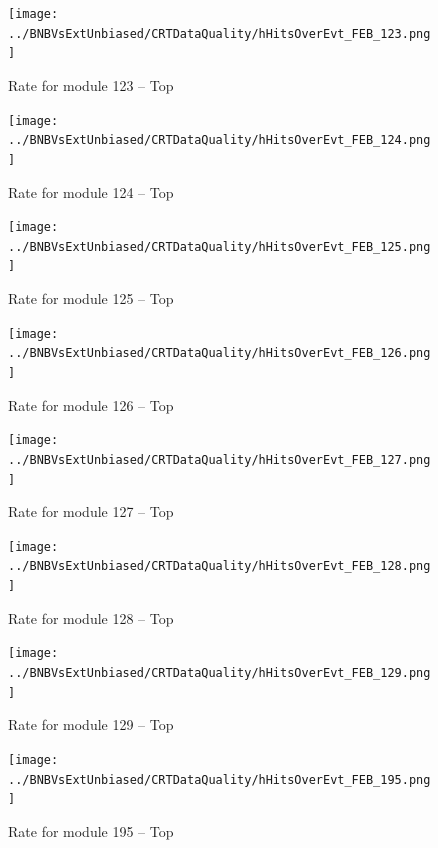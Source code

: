 \begin{figure}[h!]
\centering
\texttt{[image: ../BNBVsExtUnbiased/CRTDataQuality/hHitsOverEvt\_FEB\_123.png]}
\caption{Rate for module 123 -- Top}
\label{Annual123}
\end{figure}
\begin{figure}[h!]
\centering
\texttt{[image: ../BNBVsExtUnbiased/CRTDataQuality/hHitsOverEvt\_FEB\_124.png]}
\caption{Rate for module 124 -- Top}
\label{Annual124}
\end{figure}
\begin{figure}[h!]
\centering
\texttt{[image: ../BNBVsExtUnbiased/CRTDataQuality/hHitsOverEvt\_FEB\_125.png]}
\caption{Rate for module 125 -- Top}
\label{Annual125}
\end{figure}
\begin{figure}[h!]
\centering
\texttt{[image: ../BNBVsExtUnbiased/CRTDataQuality/hHitsOverEvt\_FEB\_126.png]}
\caption{Rate for module 126 -- Top}
\label{Annual126}
\end{figure}
\begin{figure}[h!]
\centering
\texttt{[image: ../BNBVsExtUnbiased/CRTDataQuality/hHitsOverEvt\_FEB\_127.png]}
\caption{Rate for module 127 -- Top}
\label{Annual127}
\end{figure}
\begin{figure}[h!]
\centering
\texttt{[image: ../BNBVsExtUnbiased/CRTDataQuality/hHitsOverEvt\_FEB\_128.png]}
\caption{Rate for module 128 -- Top}
\label{Annual128}
\end{figure}
\begin{figure}[h!]
\centering
\texttt{[image: ../BNBVsExtUnbiased/CRTDataQuality/hHitsOverEvt\_FEB\_129.png]}
\caption{Rate for module 129 -- Top}
\label{Annual129}
\end{figure}
\begin{figure}[h!]
\centering
\texttt{[image: ../BNBVsExtUnbiased/CRTDataQuality/hHitsOverEvt\_FEB\_195.png]}
\caption{Rate for module 195 -- Top}
\label{Annual195}
\end{figure}
\clearpage

